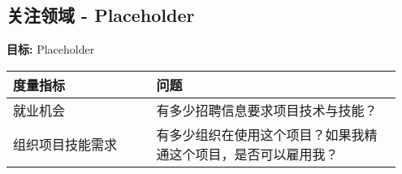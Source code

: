 
    \subsection{关注领域 - Placeholder}
    \textbf{目标:} Placeholder
    \begin{table}[ht!]
        \centering
        \begin{tabular}{|p{0.35\linewidth} | p{0.6\linewidth}|}
            \hline
            \hfil \textbf{度量指标}  & \hfil \textbf{问题} \\
            \hline
        		就业机会 & 有多少招聘信息要求项目技术与技能？ \\ 
		\hline
		组织项目技能需求 & 有多少组织在使用这个项目？如果我精通这个项目，是否可以雇用我？ \\ 
		\hline
    \end{tabular}
    \end{table}
        
 
 
